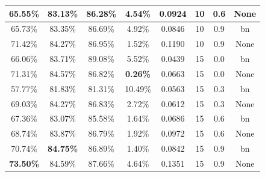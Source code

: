 \begin{table}[ht]
\begin{tabular}{|c|c|c|c|c|c|c|c|}
65.55\% & 83.13\% & 86.28\% & 4.54\% & 0.0924 & 10 & 0.6 & None\\ \hline
65.73\% & 83.35\% & 86.69\% & 4.92\% & 0.0846 & 10 & 0.9 & bn\\ \hline
71.42\% & 84.27\% & 86.95\% & 1.52\% & 0.1190 & 10 & 0.9 & None\\ \hline
66.06\% & 83.71\% & 89.08\% & 5.52\% & 0.0439 & 15 & 0.0 & bn\\ \hline
71.31\% & 84.57\% & 86.82\% & \textbf{0.26\%} & 0.0663 & 15 & 0.0 & None\\ \hline
57.77\% & 81.83\% & 81.31\% & 10.49\% & 0.0563 & 15 & 0.3 & bn\\ \hline
69.03\% & 84.27\% & 86.83\% & 2.72\% & 0.0612 & 15 & 0.3 & None\\ \hline
67.36\% & 83.07\% & 85.58\% & 1.64\% & 0.0686 & 15 & 0.6 & bn\\ \hline
68.74\% & 83.87\% & 86.79\% & 1.92\% & 0.0972 & 15 & 0.6 & None\\ \hline
70.74\% & \textbf{84.75\%} & 86.89\% & 1.40\% & 0.0842 & 15 & 0.9 & bn\\ \hline
\textbf{73.50\%} & 84.59\% & 87.66\% & 4.64\% & 0.1351 & 15 & 0.9 & None\\ \hline
\end{tabular}
\end{table}


